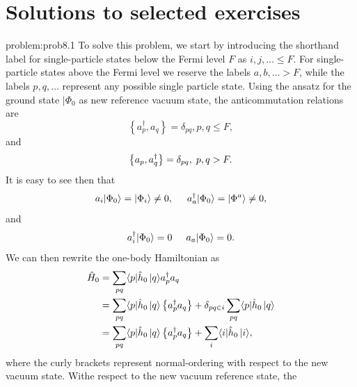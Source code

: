 \section{Solutions to selected exercises}
\begin{sol}{problem:prob8.1}
To solve this problem, we start by 
introducing the shorthand label for single-particle states below the Fermi level $F$ as
$i,j,\ldots \leq F$. For single-particle states above the Fermi level we reserve the labels $a,b,\ldots > F$, while the labels $p,q, \ldots$
represent any possible single particle state.
Using the ansatz for the ground state $\vert \Phi_0$ as new reference vacuum state, the anticommutation relations are
\[
\left\{a_p^\dagger, a_q \right\}= \delta_{pq}, p, q \leq F, 
\]
and
\[
\left\{a_p, a_q^\dagger \right\} = \delta_{pq}, \hspace{0.1cm} p, q > F.
\]
It is easy to see then that         
\[
        a_i|\Phi_0\rangle = |\Phi_i\rangle\ne 0, \hspace{0.5cm} a_a^\dagger|\Phi_0\rangle = |\Phi^a\rangle\ne 0,
\]
and         
\[
a_i^\dagger|\Phi_0\rangle = 0 \hspace{0.5cm}  a_a|\Phi_0\rangle = 0.
\]
We can then rewrite the one-body Hamiltonian as 
 \begin{align*}
        \hat{H}_0 &= \sum_{pq} \langle p|\hat{h}_0\,|{q}\rangle a^\dagger_p a_q \\
            &= \sum_{pq} \langle p|\hat{h}_0\,|{q}\rangle \left\{a^\dagger_p a_q\right\} + 
                \delta_{pq\in i} \sum_{pq} \langle p|\hat{h}_0\,|{q}\rangle \\
            &= \sum_{pq} \langle p|\hat{h}_0\,|{q}\rangle \left\{a^\dagger_p a_q\right\} +
                \sum_i \langle i|\hat{h}_0\,|{i}\rangle,
 \end{align*}
where the curly brackets represent normal-ordering with respect to the new vacuum state. Withe respect to the new vacuum reference state, the 
\end{sol}

